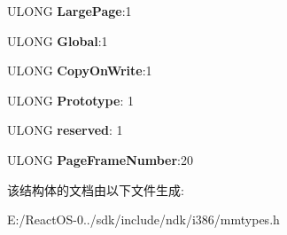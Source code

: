 \begin{DoxyCompactItemize}
U\+L\+O\+NG {\bfseries Large\+Page}\+:1
\item 
\mbox{\label{struct___h_a_r_d_w_a_r_e___p_t_e___x86_a8b9d3f9a143235b8040ead1f72e7168e}} 
U\+L\+O\+NG {\bfseries Global}\+:1
\item 
\mbox{\label{struct___h_a_r_d_w_a_r_e___p_t_e___x86_a9d55a5064420c603d699ed914389622e}} 
U\+L\+O\+NG {\bfseries Copy\+On\+Write}\+:1
\item 
\mbox{\label{struct___h_a_r_d_w_a_r_e___p_t_e___x86_adcbd7aa55276c0735a7c87e834240d17}} 
U\+L\+O\+NG {\bfseries Prototype}\+: 1
\item 
\mbox{\label{struct___h_a_r_d_w_a_r_e___p_t_e___x86_a308198992f61bfb1ea8476dba9a86557}} 
U\+L\+O\+NG {\bfseries reserved}\+: 1
\item 
\mbox{\label{struct___h_a_r_d_w_a_r_e___p_t_e___x86_a508efa1c1a1bce37ebda245b4f43cc60}} 
U\+L\+O\+NG {\bfseries Page\+Frame\+Number}\+:20
\end{DoxyCompactItemize}


该结构体的文档由以下文件生成\+:\begin{DoxyCompactItemize}
\item 
E\+:/\+React\+O\+S-\/0../sdk/include/ndk/i386/mmtypes.\+h\end{DoxyCompactItemize}
